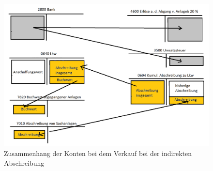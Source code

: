 \documentclass[a4paper,10pt]{report}
\begin{document}
\begin{figure}[ht]
\centering
\includegraphics[width=14cm]{Bilder/IndirekteAusbuchung-Konten_der_Bilanz}
\caption{Zusammenhang der Konten bei dem Verkauf bei der indirekten Abschreibung}
\end{figure}
\end{document}
